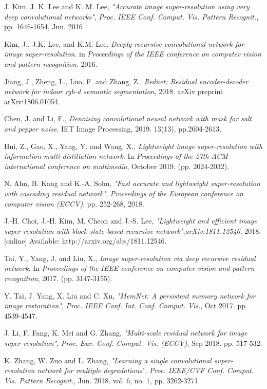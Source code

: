 \documentclass{ieeeaccess}
\begin{document}
\begin{thebibliography}{00}
 J. Kim, J. K. Lee and K. M. Lee, \textit{"Accurate image super-resolution using very deep convolutional networks"}, \textit{Proc. IEEE Conf. Comput. Vis. Pattern Recognit.}, pp. 1646-1654, Jun. 2016

 Kim, J., J.K. Lee, and K.M. Lee. \textit{Deeply-recursive convolutional network for image super-resolution}. in \textit{Proceedings of the IEEE conference on computer vision and pattern recognition}. 2016.

 Jiang, J., Zheng, L., Luo, F. and Zhang, Z., \textit{Rednet: Residual encoder-decoder network for indoor rgb-d semantic segmentation}, 2018. arXiv preprint arXiv:1806.01054.

 Chen, J. and Li, F., \textit{Denoising convolutional neural network with mask for salt and pepper noise}. IET Image Processing, 2019. 13(13), pp.2604-2613.

 Hui, Z., Gao, X., Yang, Y. and Wang, X., \textit{Lightweight image super-resolution with information multi-distillation network}. In \textit{Proceedings of the 27th ACM international conference on multimedia}, October 2019. (pp. 2024-2032).

 N. Ahn, B. Kang and K.-A. Sohn, \textit{"Fast accurate and lightweight super-resolution with cascading residual network"}, \textit{ Proceedings of the European conference on computer vision (ECCV)}, pp. 252-268, 2018.

 J.-H. Choi, J.-H. Kim, M. Cheon and J.-S. Lee, \textit{"Lightweight and efficient image super-resolution with block state-based recursive network"},\textit{arXiv:1811.12546}, 2018, [online] Available: http://arxiv.org/abs/1811.12546.

 Tai, Y., Yang, J. and Liu, X., \textit{Image super-resolution via deep recursive residual network}. In \textit{Proceedings of the IEEE conference on computer vision and pattern recognition}, 2017. (pp. 3147-3155).

 Y. Tai, J. Yang, X. Liu and C. Xu, \textit{"MemNet: A persistent memory network for image restoration"}, \textit{Proc. IEEE Conf. Int. Conf. Comput. Vis.}, Oct 2017. pp. 4539-4547. 

 J. Li, F. Fang, K. Mei and G. Zhang, \textit{"Multi-scale residual network for image super-resolution"}, \textit{Proc. Eur. Conf. Comput. Vis. (ECCV)}, Sep 2018. pp. 517-532.

 K. Zhang, W. Zuo and L. Zhang, \textit{"Learning a single convolutional super-resolution network for multiple degradations}", \textit{Proc. IEEE/CVF Conf. Comput. Vis. Pattern Recognit.}, Jun. 2018. vol. 6, no. 1, pp. 3262-3271.


\end{thebibliography}
\end{document}
